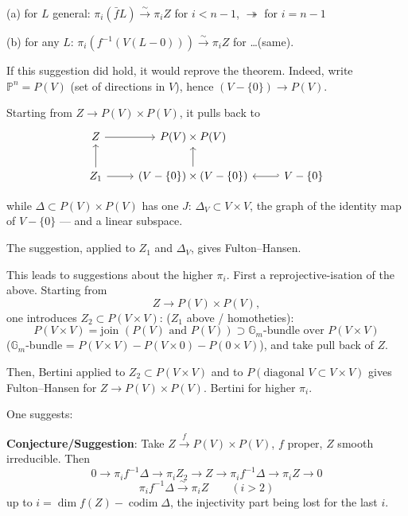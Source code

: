\documentclass[11pt,a4paper]{article}
\theoremstyle{plain}
\theoremstyle{definition}
\DeclareMathOperator{\codim}{codim}
\begin{document}
(a) for $L$ general: $\pi_i(\bar{f}L) \xrightarrow{\sim} \pi_i Z$ for $i < n-1$, $\twoheadrightarrow$ for $i = n-1$

(b) for any $L$: $\pi_i(f^{-1}(V(L - 0))) \xrightarrow{\sim} \pi_i Z$ for \ldots (same).

\medskip

If this suggestion did hold, it would reprove the theorem. Indeed, write $\mathbb{P}^n = P(V)$ (set of directions in $V$), hence $(V - \{0\}) \to P(V)$.

Starting from $Z \to P(V) \times P(V)$, it pulls back to
\[
\begin{tikzcd}
Z \arrow[r] & P(V) \times P(V) \\
Z_1 \arrow[u] \arrow[r] & (V - \{0\}) \times (V - \{0\}) \arrow[u] \arrow[r, hookleftarrow] & V - \{0\}
\end{tikzcd}
\]

\newpage

while $\Delta \subset P(V) \times P(V)$ has one $J$: $\Delta_V \subset V \times V$, the graph of the identity map of $V - \{0\}$ --- and a linear subspace.

The suggestion, applied to $Z_1$ and $\Delta_V$, gives Fulton--Hansen.

\medskip

This leads to suggestions about the higher $\pi_i$. First a reprojective-isation of the above. Starting from
\[
Z \longrightarrow P(V) \times P(V),
\]
one introduces $Z_2 \subset P(V \times V)$: ($Z_1$ above / homotheties):
\[
P(V \times V) = \text{join }(P(V) \text{ and } P(V)) \supset \mathbb{G}_m\text{-bundle over } P(V \times V)
\]
($\mathbb{G}_m$-bundle = $P(V \times V) - P(V \times 0) - P(0 \times V)$), and take pull back of $Z$.

Then, Bertini applied to $Z_2 \subset P(V \times V)$ and to $P(\text{diagonal } V \subset V \times V)$ gives Fulton--Hansen for $Z \to P(V) \times P(V)$. Bertini for higher $\pi_i$.

\medskip

One suggests:

\medskip

\noindent \textbf{Conjecture/Suggestion}: Take $Z \xrightarrow{f} P(V) \times P(V)$, $f$ proper, $Z$ smooth irreducible. Then
\[
0 \to \pi_i f^{-1}\Delta \to \pi_i Z_2 \to Z \to \pi_i f^{-1}\Delta \to \pi_i Z \to 0
\]
\[
\pi_i f^{-1}\Delta \xrightarrow{\sim} \pi_i Z \qquad (i > 2)
\]
up to $i = \dim f(Z) - \codim \Delta$, the injectivity part being lost for the last $i$.
\end{document}
